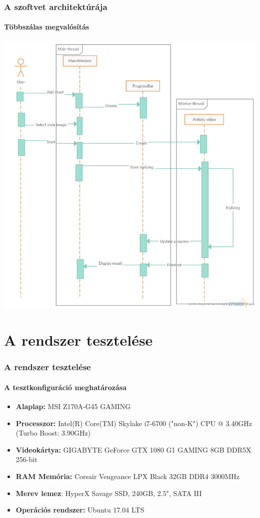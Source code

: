 \documentclass{beamer}
\begin{document}
	\begin{frame}
		\frametitle{A szoftvet architektúrája}
		\framesubtitle{Többszálas megvalósítás}
		\begin{center}
			\includegraphics[scale=0.2]{seq_diagram.png}
		\end{center}
	\end{frame}

	\section{A rendszer tesztelése}
	
	\begin{frame}
		\frametitle{A rendszer tesztelése}
		\framesubtitle{A tesztkonfiguráció meghatározása}
		
		\begin{itemize}
			\item \textbf{Alaplap:} MSI Z170A-G45 GAMING
			\item \textbf{Processzor:} Intel(R) Core(TM) Skylake i7-6700 ("non-K") CPU @ 3.40GHz (Turbo Boost: 3.90GHz)
			\item \textbf{Videokártya:} GIGABYTE GeForce GTX 1080 G1 GAMING 8GB DDR5X 256-bit
			\item \textbf{RAM Memória:} Corsair Vengeance LPX Black 32GB DDR4 3000MHz
			\item \textbf{Merev lemez}: HyperX Savage SSD, 240GB, 2.5", SATA III
			\item \textbf{Operációs rendszer:} Ubuntu 17.04 LTS
		\end{itemize}
	\end{frame}
\end{document}
